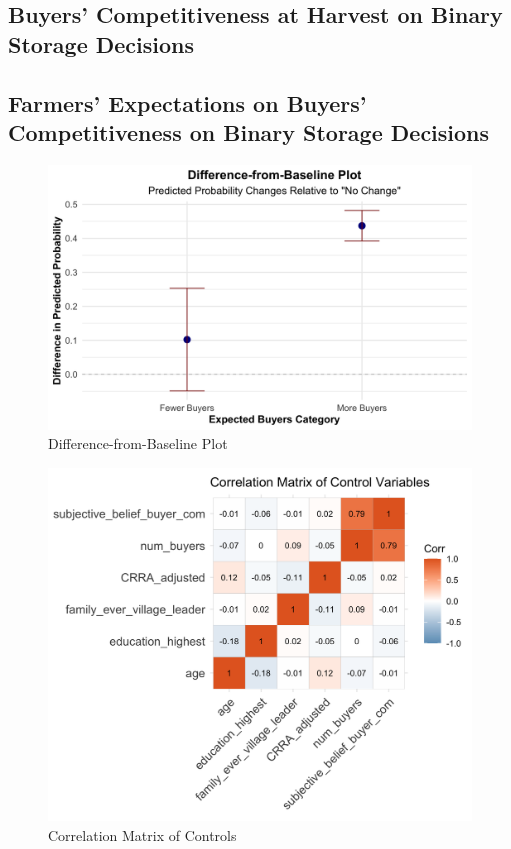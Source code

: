 \documentclass[12pt]{article}
\begin{document}
\newpage
\subsection{Buyers' Competitiveness at Harvest on Binary Storage Decisions}




\newpage
\subsection{Farmers' Expectations on Buyers' Competitiveness on Binary Storage Decisions}





\begin{figure}[H]
\centering
\includegraphics[width=1\textwidth]{figures/filtered_difference_from_baseline_plot.png}
\caption{Difference-from-Baseline Plot}
\label{Figure: Difference-from-Baseline Plot}
\end{figure}

\newpage
\begin{figure}[H]
\centering
\includegraphics[width=1\textwidth]{figures/correlation_matrix_controls.png}
\caption{Correlation Matrix of Controls}
\label{Figure: Correlation Matrix of Controls}
\end{figure}
\end{document}
